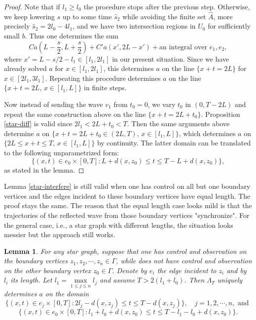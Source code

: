 \documentclass[11pt]{amsart}
\theoremstyle{definition}
\theoremstyle{plain}
\newtheorem{lemma}[definition]{Lemma}
\numberwithin{equation}{section}
\begin{document}
\begin{proof}
Note that if $l_1\geq l_0$ the procedure stops after the previous step. Otherwise,
we keep lowering $s$ up to some time $\hat{s}_2$ while avoiding the finite set $\hat{A}$, more precisely $\hat{s}_2=2l_0-4l_1$, and we have two intersection regions in $U_0$ for sufficiently small $b$. Thus one determines the sum
$$C  a(L-\frac{s}{2},L+\frac{s}{2}) + C'  a(x',2L-x') + \textrm{an integral over }e_1,e_2,$$
where $x'=L-s/2-l_1\in [l_1,2l_1]$ in our present situation. Since we have already solved $a$ for $x\in [l_1,2l_1]$, this determines $a$ on the line $\{x+t=2L\}$ for $x\in [2l_1,3l_1]$.
{Repeating this procedure determines $a$ on the line $\{x+t=2L,\, x\in [l_1,L]\}$ in finite steps.}

Now instead of sending the wave $v_1$ from $t_0=0$, we vary $t_0$ in $(0,T-2L)$ and repeat the same construction above on the line $\{x+t=2L+t_0\}$. 
Proposition \ref{star-diff} is valid since $2l_1 < 2L+t_0< T$.
Then the same arguments above determine $a$ on 
$\big\{x+t=2L+t_0\in (2L,T), \, x\in [l_1,L] \big\}$, which determines $a$ on $\big\{2L \leq x+t \leq T, \, x\in [l_1,L] \big\}$ by continuity.
The latter domain can be translated to the following unparametrized form:
$$\big\{(x,t)\in e_0\times [0,T]: 
L+d(x,z_0) \leq t \leq T-L+d(x,z_0) \big\},$$
as stated in the lemma.
\end{proof}

Lemma \ref{star-interfere} is still valid when one has control on all but one boundary vertices and the edges incident to these boundary vertices have equal length. The proof stays the same. The reason that the equal length case looks mild is that the trajectories of the reflected wave from those boundary vertices "synchronize".
For the general case, i.e., a star graph with different lengths, the situation looks messier but the approach still works.


\begin{lemma} \label{star-general}
For any star graph, 
suppose that one has control and observation on the boundary vertices $z_1,z_2,\cdots,z_{n}\in \Gamma$, while does not have control and observation on the other boundary vertex $z_0\in \Gamma$. Denote by $e_i$ the edge incident to $z_i$ and by $l_i$ its length.
Let $l_1=\max\limits_{1\leq j\leq n}l_j$ and assume $T>2(l_1+l_0)$.
Then $\Lambda_T$ uniquely determines $a$ on the domain
$$\big\{(x,t)\in e_j\times [0,T]: 2l_j-d(x,z_j)\leq t\leq T-d(x,z_j)  \big\},\quad j=1,2,\cdots,n, \textrm{ and }$$
$$\big\{ (x,t)\in e_0\times [0,T]:  l_1+l_0+d(x,z_0) \leq t \leq T-l_1-l_0+d(x,z_0)\big\}.$$
\end{lemma}
\end{document}
